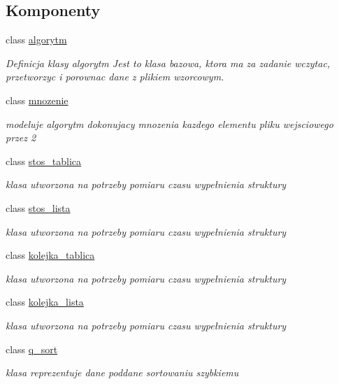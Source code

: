 \subsection*{Komponenty}
\begin{DoxyCompactItemize}
\item 
class \hyperlink{classalgorytm}{algorytm}
\begin{DoxyCompactList}\small\item\em Definicja klasy algorytm Jest to klasa bazowa, ktora ma za zadanie wczytac, przetworzyc i porownac dane z plikiem wzorcowym. \end{DoxyCompactList}\item 
class \hyperlink{classmnozenie}{mnozenie}
\begin{DoxyCompactList}\small\item\em modeluje algorytm dokonujacy mnozenia kazdego elementu pliku wejsciowego przez 2 \end{DoxyCompactList}\item 
class \hyperlink{classstos__tablica}{stos\-\_\-tablica}
\begin{DoxyCompactList}\small\item\em klasa utworzona na potrzeby pomiaru czasu wypełnienia struktury \end{DoxyCompactList}\item 
class \hyperlink{classstos__lista}{stos\-\_\-lista}
\begin{DoxyCompactList}\small\item\em klasa utworzona na potrzeby pomiaru czasu wypełnienia struktury \end{DoxyCompactList}\item 
class \hyperlink{classkolejka__tablica}{kolejka\-\_\-tablica}
\begin{DoxyCompactList}\small\item\em klasa utworzona na potrzeby pomiaru czasu wypełnienia struktury \end{DoxyCompactList}\item 
class \hyperlink{classkolejka__lista}{kolejka\-\_\-lista}
\begin{DoxyCompactList}\small\item\em klasa utworzona na potrzeby pomiaru czasu wypełnienia struktury \end{DoxyCompactList}\item 
class \hyperlink{classq__sort}{q\-\_\-sort}
\begin{DoxyCompactList}\small\item\em klasa reprezentuje dane poddane sortowaniu szybkiemu \end{DoxyCompactList}\item 

\end{DoxyCompactItemize}
